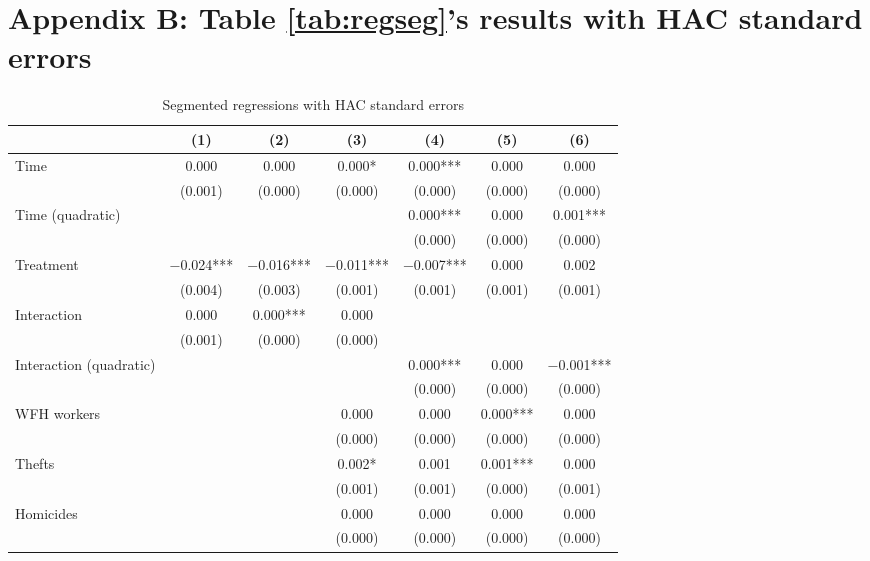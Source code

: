 \documentclass[11pt,a4paper]{article}\usepackage[]{graphicx}\usepackage[]{xcolor}
\begin{document}
\section*{Appendix B: Table \ref{tab:regseg}'s results with HAC standard errors}
\label{sec:appb}
\setcounter{table}{0} %
\renewcommand{\thetable}{B.\arabic{table}} %
\begin{table}[h]
\caption{Segmented regressions with HAC standard errors}
\label{app:seg}

\begin{tabular}[t]{lcccccc}
\toprule
  & (1) & (2) & (3) & (4) & (5) & (6)\\
\midrule
Time & \num{0.000} & \num{0.000} & \num{0.000}* & \num{0.000}*** & \num{0.000} & \num{0.000}\\
 & (\num{0.001}) & (\num{0.000}) & (\num{0.000}) & (\num{0.000}) & (\num{0.000}) & (\num{0.000})\\
Time (quadratic) &  &  &  & \num{0.000}*** & \num{0.000} & \num{0.001}***\\
 &  &  &  & (\num{0.000}) & (\num{0.000}) & \vphantom{1} (\num{0.000})\\
Treatment & \num{-0.024}*** & \num{-0.016}*** & \num{-0.011}*** & \num{-0.007}*** & \num{0.000} & \num{0.002}\\
 & (\num{0.004}) & (\num{0.003}) & (\num{0.001}) & (\num{0.001}) & (\num{0.001}) & (\num{0.001})\\
Interaction & \num{0.000} & \num{0.000}*** & \num{0.000} &  &  & \\
 & (\num{0.001}) & (\num{0.000}) & (\num{0.000}) &  &  & \\
Interaction (quadratic) &  &  &  & \num{0.000}*** & \num{0.000} & \num{-0.001}***\\
 &  &  &  & (\num{0.000}) & (\num{0.000}) & (\num{0.000})\\
WFH workers &  &  & \num{0.000} & \num{0.000} & \num{0.000}*** & \num{0.000}\\
 &  &  & (\num{0.000}) & (\num{0.000}) & (\num{0.000}) & \vphantom{2} (\num{0.000})\\
Thefts &  &  & \num{0.002}* & \num{0.001} & \num{0.001}*** & \num{0.000}\\
 &  &  & (\num{0.001}) & (\num{0.001}) & (\num{0.000}) & (\num{0.001})\\
Homicides &  &  & \num{0.000} & \num{0.000} & \num{0.000} & \num{0.000}\\
 &  &  & (\num{0.000}) & (\num{0.000}) & (\num{0.000}) & \vphantom{1} (\num{0.000})\\

\end{tabular}
\end{table}
\end{document}
